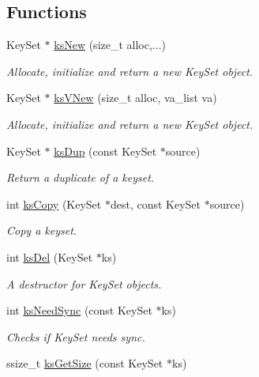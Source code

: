 \subsection*{Functions}
\begin{DoxyCompactItemize}
\item 
Key\-Set $\ast$ \hyperlink{group__keyset_ga671e1aaee3ae9dc13b4834a4ddbd2c3c}{ks\-New} (size\-\_\-t alloc,...)
\begin{DoxyCompactList}\small\item\em Allocate, initialize and return a new Key\-Set object. \end{DoxyCompactList}\item 
Key\-Set $\ast$ \hyperlink{group__keyset_ga4ff760f56693b51ab785ed7ce628e649}{ks\-V\-New} (size\-\_\-t alloc, va\-\_\-list va)
\begin{DoxyCompactList}\small\item\em Allocate, initialize and return a new Key\-Set object.  \end{DoxyCompactList}\item 
Key\-Set $\ast$ \hyperlink{group__keyset_gac59e4b328245463f1451f68d5106151c}{ks\-Dup} (const Key\-Set $\ast$source)
\begin{DoxyCompactList}\small\item\em Return a duplicate of a keyset. \end{DoxyCompactList}\item 
int \hyperlink{group__keyset_gaba1f1dbea191f4d7e7eb3e4296ae7d5e}{ks\-Copy} (Key\-Set $\ast$dest, const Key\-Set $\ast$source)
\begin{DoxyCompactList}\small\item\em Copy a keyset. \end{DoxyCompactList}\item 
int \hyperlink{group__keyset_ga27e5c16473b02a422238c8d970db7ac8}{ks\-Del} (Key\-Set $\ast$ks)
\begin{DoxyCompactList}\small\item\em A destructor for Key\-Set objects. \end{DoxyCompactList}\item 
int \hyperlink{group__keyset_ga8f210432e664d8ba06d7d55a2aba2d0f}{ks\-Need\-Sync} (const Key\-Set $\ast$ks)
\begin{DoxyCompactList}\small\item\em Checks if Key\-Set needs sync. \end{DoxyCompactList}\item 
ssize\-\_\-t \hyperlink{group__keyset_ga7474ad6b0a0fa969dbdf267ba5770eee}{ks\-Get\-Size} (const Key\-Set $\ast$ks)

\end{DoxyCompactItemize}
